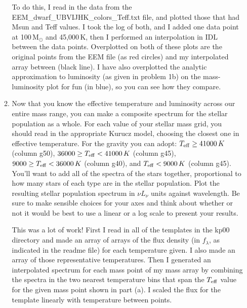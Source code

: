 \documentclass[11pt]{article}
\begin{document}
\begin{enumerate}
\begin{enumerate}
{\color{gray} To do this, I read in the data from the
  EEM\_dwarf\_UBVIJHK\_colors\_Teff.txt file, and plotted those that
  had Msun and Teff values.  I took the log of both, and I added one
  data point at 100\,M$_\odot$ and 45,000\,K, then I performed an
  interpolation in IDL between the data points.  Overplotted on both
  of these plots are the original points from the EEM file (as red
  circles) and my interpolated array between (black line).  I have
  also overplotted the analytic approximation to luminosity (as given
  in problem 1b) on the mass-luminosity plot for fun (in blue), so you can see
  how they compare.

\begin{figure}[h!]
\centering
\end{figure}

}


  \item Now that you know the effective temperature and luminosity
    across our entire mass range, you can make a composite spectrum
    for the stellar population as a whole.  For each value of your
    stellar mass grid, you should read in the appropriate Kurucz
    model, choosing the closest one in effective temperature.  For the
    gravity you can adopt: $T_{\rm eff}\ge41000\,K$ (column g50),
    $36000\ge T_{\rm eff}<41000\,K$ (column g45), $9000\ge T_{\rm
      eff}<36000\,K$ (column g40), and $T_{\rm eff}<9000\,K$ (column
    g45).  You'll want to add all of the spectra of the stars
    together, proportional to how many stars of each type are in the
    stellar population.  Plot the resulting stellar population
    spectrum in $\nu L_\nu$ units against wavelength.  Be sure to make
    sensible choices for your axes and think about whether or not it
    would be best to use a linear or a log scale to present your
    results.

{\color{gray} This was a lot of work!  First I read in all of the
  templates in the kp00 directory and made an array of arrays of the
  flux density (in $f_\lambda$, as indicated in the readme file) for
  each temperature given.  I also made an array of those
  representative temperatures.  Then I generated an interpolated
  spectrum for each mass point of my mass array by combining the
  spectra in the two nearest temperature bins that span the $T_{\rm
    eff}$ value for the given mass point shown in part (a). I scaled
  the flux for the template linearly with temperature between points.

}
\end{enumerate}
\end{enumerate}
\end{document}
